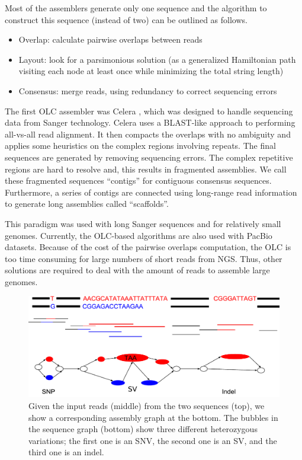 Most of the assemblers generate only one sequence and the algorithm to construct this sequence (instead of two) can be outlined as follows.
\begin{itemize}
 \item Overlap: calculate pairwise overlaps between reads
 \item  Layout: look for a parsimonious solution (as a generalized Hamiltonian path visiting each node at least once while minimizing the total string length)
 \item  Consensus: merge reads, using redundancy to correct sequencing errors
\end{itemize}

The first OLC assembler was Celera \citep{myers2000whole}, which was designed to handle sequencing data from Sanger technology.
Celera uses a BLAST-like approach to performing all-vs-all read alignment. It then compacts the overlaps with no ambiguity and applies some heuristics on the complex regions involving repeats. The final sequences
are generated by removing sequencing errors. The complex repetitive regions are hard to resolve and, this results in fragmented assemblies.  We call these fragmented sequences
``contigs'' for contiguous consensus sequences. Furthermore, a series of contigs are connected using long-range read information to generate long assemblies called ``scaffolds''.

This paradigm was used with long Sanger sequences and for relatively small
genomes. Currently, the OLC-based algorithms are also used with PacBio datasets. 
Because of the cost of the pairwise overlaps computation, the OLC is too time
consuming for large numbers of short reads from NGS. Thus, other solutions are required to deal with the amount of reads to assemble large genomes.
\bigskip

\begin{figure}[t!]\centering
\includegraphics[width=\columnwidth]{ex_sv.pdf}
\caption{Given the input reads (middle) from the two sequences (top), we show a corresponding assembly graph at the bottom.
The bubbles in the sequence graph (bottom) show three different heterozygous variations; the first one is an SNV, the second one is an SV, and the third one is an indel. }
\label{fig:ex_sv}
\end{figure}

